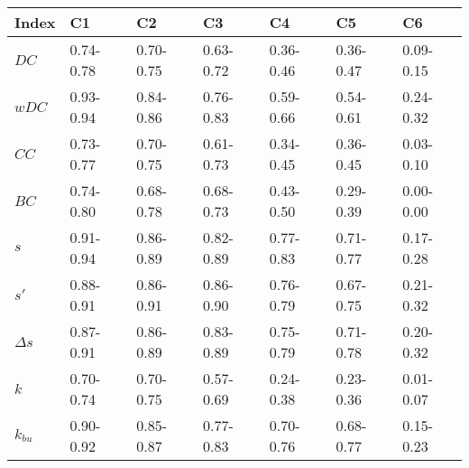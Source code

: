 \begin{table}[ht]
\centering
\begin{tabular}{lllllll}
  \hline
Index & C1 & C2 & C3 & C4 & C5 & C6 \\ 
  \hline
\(\displaystyle DC \) & {\color[HTML]{00D768} 0.74-0.78} & {\color[HTML]{EF2A00} 0.70-0.75} & {\color[HTML]{0051D7} 0.63-0.72} & {\color[HTML]{6200D7} 0.36-0.46} & {\color{orange} 0.36-0.47} & {\color[HTML]{9B9B9B} 0.09-0.15} \\ 
\(\displaystyle wDC \) &   {\color[HTML]{EF2A00} 0.93-0.94} & {\color[HTML]{00D768} 0.84-0.86} & {\color[HTML]{0051D7} 0.76-0.83} & {\color{orange} 0.59-0.66} & {\color[HTML]{6200D7} 0.54-0.61} & {\color[HTML]{9B9B9B} 0.24-0.32} \\ 
\(\displaystyle CC \) &   {\color[HTML]{00D768} 0.73-0.77} & {\color[HTML]{EF2A00} 0.70-0.75} & {\color[HTML]{0051D7} 0.61-0.73} & {\color[HTML]{6200D7} 0.34-0.45} & {\color{orange} 0.36-0.45} & {\color[HTML]{9B9B9B} 0.03-0.10} \\ 
\(\displaystyle BC \) &   {\color[HTML]{00D768} 0.74-0.80} & {\color[HTML]{0051D7} 0.68-0.78} & {\color[HTML]{EF2A00} 0.68-0.73} & {\color{orange} 0.43-0.50} & {\color[HTML]{6200D7} 0.29-0.39} & {\color[HTML]{9B9B9B} 0.00-0.00} \\ 
\(\displaystyle s \) &   {\color[HTML]{00D768} 0.91-0.94} & {\color[HTML]{EF2A00} 0.86-0.89} & {\color[HTML]{0051D7} 0.82-0.89} & {\color{orange} 0.77-0.83} & {\color[HTML]{6200D7} 0.71-0.77} & {\color[HTML]{9B9B9B} 0.17-0.28} \\ 
\(\displaystyle s' \) &   {\color[HTML]{EF2A00} 0.88-0.91} & {\color[HTML]{0051D7} 0.86-0.91} & {\color[HTML]{00D768} 0.86-0.90} & {\color[HTML]{6200D7} 0.76-0.79} & {\color{orange} 0.67-0.75} & {\color[HTML]{9B9B9B} 0.21-0.32} \\ 
\(\displaystyle \Delta s \) &   {\color[HTML]{00D768} 0.87-0.91} & {\color[HTML]{EF2A00} 0.86-0.89} & {\color[HTML]{0051D7} 0.83-0.89} & {\color[HTML]{6200D7} 0.75-0.79} & {\color{orange} 0.71-0.78} & {\color[HTML]{9B9B9B} 0.20-0.32} \\ 
\(\displaystyle k \) &   {\color[HTML]{00D768} 0.70-0.74} & {\color[HTML]{EF2A00} 0.70-0.75} & {\color[HTML]{0051D7} 0.57-0.69} & {\color[HTML]{6200D7} 0.24-0.38} & {\color{orange} 0.23-0.36} & {\color[HTML]{9B9B9B} 0.01-0.07} \\ 
\(\displaystyle k_{bu} \) &   {\color[HTML]{00D768} 0.90-0.92} & {\color[HTML]{EF2A00} 0.85-0.87} & {\color[HTML]{0051D7} 0.77-0.83} & {\color[HTML]{6200D7} 0.70-0.76} & {\color{orange} 0.68-0.77} & {\color[HTML]{9B9B9B} 0.15-0.23} \\ 

\end{tabular}
\end{table}
